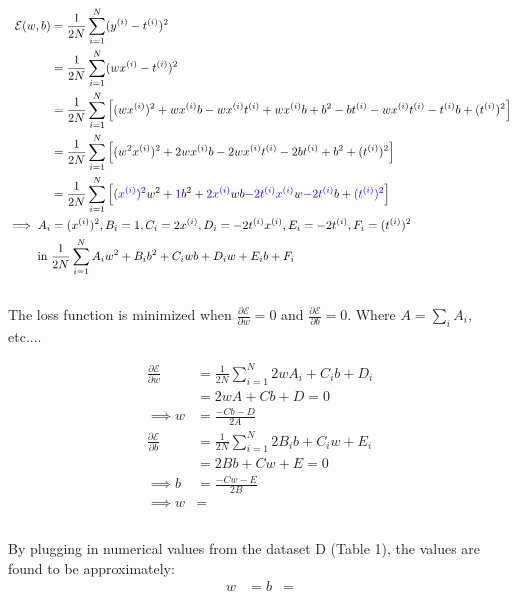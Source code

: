 \documentclass{article}
\begin{document}
\begin{align*}
\mathcal{E} (w, b) &= \frac{1}{2N} \sum_{i = 1}^{N} (y^{(i)} - t^{(i)})^2 \\
&=  \frac{1}{2N} \sum_{i = 1}^{N} (wx^{(i)} - t^{(i)})^2 \\
&= \frac{1}{2N}  \sum_{i = 1}^{N}  \left[ (wx^{(i)})^2 + wx^{(i)}b -wx^{(i)} t^{(i)} + wx^{(i)}b + b^2 - bt^{(i)} - wx^{(i)}t^{(i)} - t^{(i)}b + (t^{(i)})^2 \right] \\
&= \frac{1}{2N}  \sum_{i = 1}^{N}  \left[ (w^2 x^{(i)})^2 + 2wx^{(i)} b - 2w x^{(i)} t^{(i)} - 2bt^{(i)} + b^2 + (t^{(i)})^2 \right] \\
&= \frac{1}{2N}  \sum_{i = 1}^{N} \left[ \textcolor{blue}{(x^{(i)})^2} w^2 + \textcolor{blue}{1}b^2 + \textcolor{blue}{2x^{(i)}}wb  \textcolor{blue}{-2t^{(i)}x^{(i)}}w \textcolor{blue}{ -2t^{(i)}}b + \textcolor{blue}{(t^{(i)})^2}	\right] \\
\implies A_i &= (x^{(i)})^2, B_i = 1, C_i = 2x^{(i)}, D_i = -2t^{(i)}x^{(i)}, E_i = -2t^{(i)}, F_i = (t^{(i)})^2 \\
\text{in} \; & \frac{1}{2N} \sum_{i = 1}^{N} A_i w^2 + B_i b^2 + C_i wb + D_i w + E_i b + F_i
\end{align*}

\subsection{}
\noindent The loss function is minimized when $\frac{\partial \mathcal{E}}{\partial w} = 0$ and $\frac{\partial \mathcal{E}}{\partial b} = 0$. Where $A = \sum_i A_i,$ etc....

\begin{align}
\frac{\partial \mathcal{E}}{\partial w} &=  \frac{1}{2N} \sum_{i = 1}^{N} 2wA_i + C_i b + D_i \\
&= 2wA + Cb + D = 0 \\
\implies w &= \frac{-Cb - D}{2A} \\
\frac{\partial{\mathcal{E}}}{\partial b} &=  \frac{1}{2N} \sum_{i = 1}^{N} 2 B_i b + C_i w + E_i \\
&= 2Bb + Cw + E = 0 \\
\implies b &= \frac{-Cw -E}{2B} \\
\implies w &= %
\end{align}


\subsection{}
By plugging in numerical values from the dataset D (Table 1), the values are found to be approximately:
\begin{align}
w&=
b &= 
\end{align}
\end{document}
